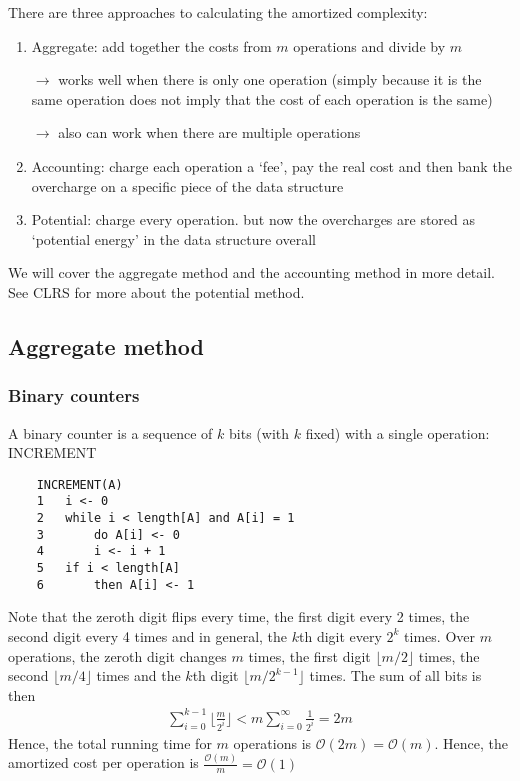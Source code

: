 \documentclass[11pt]{article}
\begin{document}
There are three approaches to calculating the amortized complexity:
\begin{enumerate}
    \item Aggregate: add together the costs from $m$ operations and divide by $m$
    
    $\rightarrow$ works well when there is only one operation (simply because it is the same operation does not imply that the cost of each operation is the same) 
    
    $\rightarrow$ also can work when there are multiple operations 
    
    \item Accounting: charge each operation a `fee', pay the real cost and then bank the overcharge on a specific piece of the data structure
    
    \item Potential: charge every operation. but now the overcharges are stored as `potential energy' in the data structure overall 
\end{enumerate}
We will cover the aggregate method and the accounting method in more detail. See CLRS for more about the potential method. 

\subsection{Aggregate method}
\subsubsection{Binary counters}
A binary counter is a sequence of $k$ bits (with $k$ fixed) with a single operation: INCREMENT

\begin{verbatim}
    INCREMENT(A)
    1   i <- 0 
    2   while i < length[A] and A[i] = 1
    3       do A[i] <- 0 
    4       i <- i + 1
    5   if i < length[A]
    6       then A[i] <- 1
\end{verbatim}

Note that the zeroth digit flips every time, the first digit every 2 times, the second digit every 4 times and in general, the $k$th digit every $2^{k}$ times. Over $m$ operations, the zeroth digit changes $m$ times, the first digit $\lfloor m/2 \rfloor$ times, the second $\lfloor m/4 \rfloor$ times and the $k$th digit $\lfloor m/2^{k-1}\rfloor $ times. The sum of all bits is then 
\begin{align*}
    \sum_{i=0}^{k-1} \lfloor \frac{m}{2^i}\rfloor < m \sum_{i=0}^\infty \frac{1}{2^i} = 2m 
\end{align*}
Hence, the total running time for $m$ operations is $\mathcal{O}(2m)= \mathcal{O}(m)$. Hence, the amortized cost per operation is $\frac{\mathcal{O}(m)}{m} = \mathcal{O}(1)$
\end{document}
